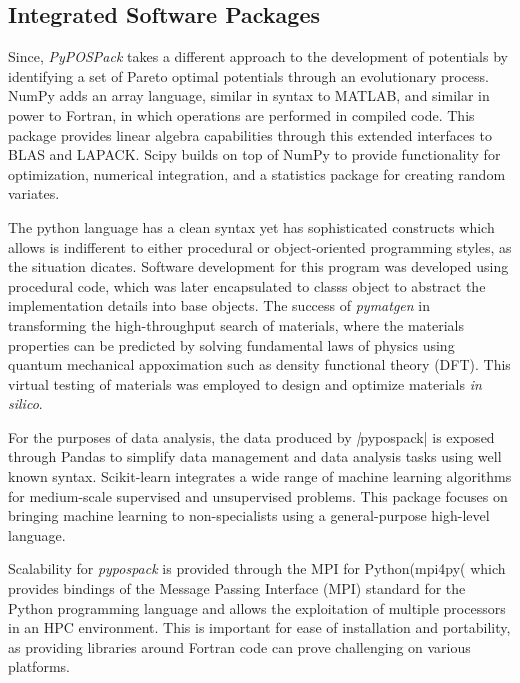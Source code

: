 \subsection{Integrated Software Packages}
Since, \emph{PyPOSPack} takes a different approach to the development of potentials by identifying a set of Pareto optimal potentials through an evolutionary process.  NumPy\cite{walt2011_numpy} adds an array language, similar in syntax to MATLAB, and similar in power to Fortran, in which operations are performed in compiled code.  This package provides linear algebra capabilities through this extended interfaces to BLAS\cite{blas2002} and LAPACK\cite{anderson1990_lapack}.  Scipy\cite{jones_scipy} builds on top of NumPy to provide functionality for optimization, numerical integration, and a statistics package for creating random variates.

The python language has a clean syntax yet has sophisticated constructs which allows is indifferent to either procedural or object-oriented programming styles, as the situation dicates.  Software development for this program was developed using procedural code, which was later encapsulated to classs object to abstract the implementation details into base objects.  The success of \emph{pymatgen} in transforming the high-throughput search of materials,  where the materials properties can be predicted by solving fundamental laws of physics using quantum mechanical appoximation such as density functional theory (DFT).  This virtual testing of materials was employed to design and optimize materials \emph{in silico}.

For the purposes of data analysis, the data produced by \emph|pypospack| is exposed through Pandas\cite{mckinney2010_pandas} to simplify data management and data analysis tasks using well known syntax.
Scikit-learn\cite{pedregosa2011_sklearn} integrates a wide range of machine learning algorithms for medium-scale supervised and unsupervised problems. This package focuses on bringing machine learning to non-specialists using a general-purpose high-level language.

Scalability for \emph{pypospack} is provided through the MPI for Python(mpi4py(\cite{dalcin2005_mpi4py,dalcin2008_mpi4py} which provides bindings of the Message Passing Interface (MPI)\cite{mpi2015} standard for the Python programming language and allows the exploitation of multiple processors in an HPC environment.  This is important for ease of installation and portability, as providing libraries around Fortran code can prove challenging on various platforms.

